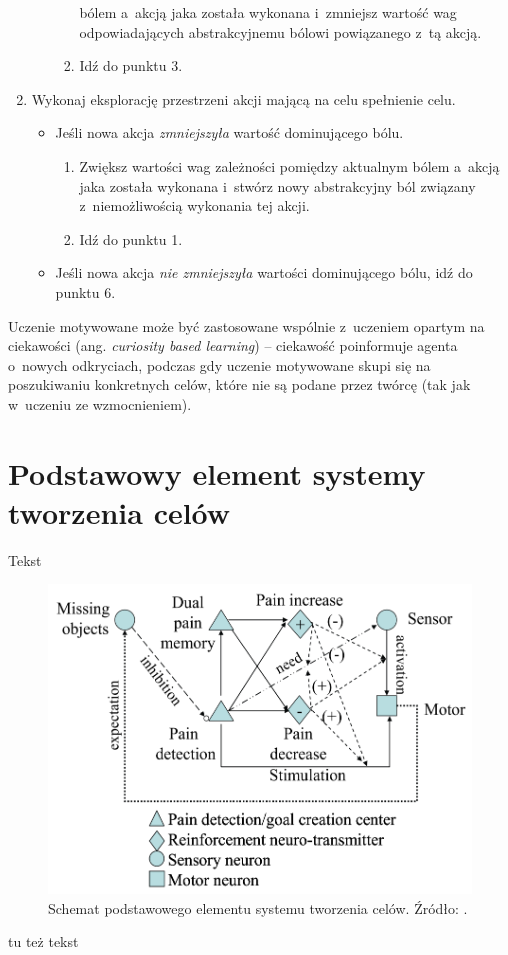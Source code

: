 \begin{enumerate}
\begin{itemize}
\begin{enumerate}
                        bólem a~akcją jaka została wykonana i~zmniejsz wartość 
                        wag odpowiadających abstrakcyjnemu bólowi powiązanego 
                        z~tą akcją.
                    \item Idź do punktu 3.
                \end{enumerate}
        \end{itemize}
    \item Wykonaj eksplorację przestrzeni akcji mającą na celu spełnienie celu.
        \begin{itemize}
            \item Jeśli nowa akcja \textit{zmniejszyła} wartość dominującego bólu.
                \begin{enumerate}
                    \item Zwiększ wartości wag zależności pomiędzy aktualnym 
                        bólem a~akcją jaka została wykonana i~stwórz nowy 
                        abstrakcyjny ból związany z~niemożliwością wykonania 
                        tej akcji.
                    \item Idź do punktu 1.
                \end{enumerate}
            \item Jeśli nowa akcja \textit{nie zmniejszyła} wartości 
                dominującego bólu, idź do punktu 6.
        \end{itemize}
\end{enumerate}

Uczenie motywowane może być zastosowane wspólnie z~uczeniem opartym na 
ciekawości (ang. \textit{curiosity based learning}) -- ciekawość poinformuje 
agenta o~nowych odkryciach, podczas gdy uczenie motywowane skupi się na 
poszukiwaniu konkretnych celów, które nie są podane przez twórcę (tak jak 
w~uczeniu ze wzmocnieniem).

\section{Podstawowy element systemy tworzenia celów}

Tekst

\begin{figure}[H]
	\centering
	\includegraphics[width=0.7\linewidth]{rozdzial2/images/goal_creation_system_unit}
	\caption{Schemat podstawowego elementu systemu tworzenia celów. Źródło: 
	\cite{motivation_in_ei}.}
	\label{fig:goalcreationsystemunit}
\end{figure}

tu też tekst
